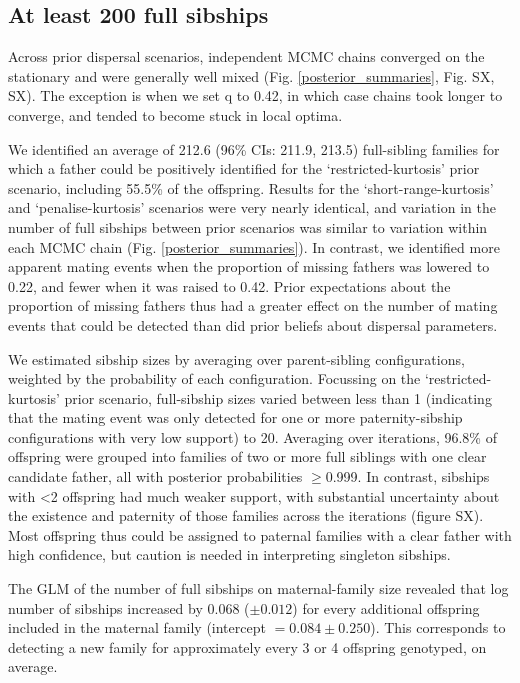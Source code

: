 \documentclass[10pt, a4paper, twocolumn]{article} %
\begin{document}
\subsection{At least 200 full sibships}

Across prior dispersal scenarios, independent MCMC chains converged on the stationary and were generally well mixed (Fig. \ref{posterior_summaries}, Fig. SX, SX). The exception is when we set q to 0.42, in which case chains took longer to converge, and tended to become stuck in local optima.

We identified an average of 212.6 (96\% CIs: 211.9, 213.5) full-sibling families for which a father could be positively identified for the ‘restricted-kurtosis’ prior scenario, including 55.5\% of the offspring. Results for the ‘short-range-kurtosis’ and ‘penalise-kurtosis’ scenarios were very nearly identical, and variation in the number of full sibships between prior scenarios was similar to variation within each MCMC chain (Fig. \ref{posterior_summaries}). In contrast, we identified more apparent mating events when the proportion of missing fathers was lowered to 0.22, and fewer when it was raised to 0.42. Prior expectations about the proportion of missing fathers thus had a greater effect on the number of mating events that could be detected than did prior beliefs about dispersal parameters.

We estimated sibship sizes by averaging over parent-sibling configurations, weighted by the probability of each configuration. Focussing on the ‘restricted-kurtosis’ prior scenario, full-sibship sizes varied between less than 1 (indicating that the mating event was only detected for one or more paternity-sibship configurations with very low support) to 20. Averaging over iterations, 96.8\% of offspring were grouped into families of two or more full siblings with one clear candidate father, all with posterior probabilities $\geq$0.999. In contrast, sibships with <2 offspring had much weaker support, with substantial uncertainty about the existence and paternity of those families across the iterations (figure SX). Most offspring thus could be assigned to paternal families with a clear father with high confidence, but caution is needed in interpreting singleton sibships.

The GLM of the number of full sibships on maternal-family size revealed that log number of sibships increased by 0.068 ($\pm0.012$) for every additional offspring included in the maternal family (intercept $= 0.084 \pm 0.250$). This corresponds to detecting a new family for approximately every 3 or 4 offspring genotyped, on average.
\end{document}
